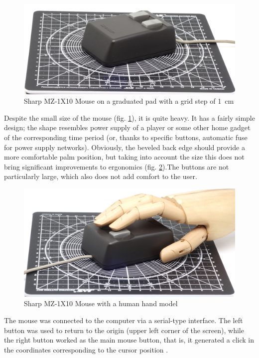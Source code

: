 \documentclass[11pt, a4paper]{article}
\begin{document}
\begin{figure}[h]
    \centering
    \includegraphics[scale=0.5]{1983_sharp_mz_1x10_mouse/size_30.jpg}
    \caption{Sharp MZ-1X10 Mouse on a graduated pad with a grid step of 1~cm}
    \label{fig:SharpMZ1x10Size}
\end{figure}

Despite the small size of the mouse (fig. \ref{fig:SharpMZ1x10Size}), it is quite heavy. It has a fairly simple design; the shape resembles power supply of a player or some other home gadget of the corresponding time period (or, thanks to specific buttons, automatic fuse for power supply networks). Obviously, the beveled back edge should provide a more comfortable palm position, but taking into account the size this does not bring significant improvements to ergonomics (fig. \ref{fig:SharpMZ1x10Hand}).The buttons are not particularly large, which also does not add comfort to the user.

\begin{figure}[h]
    \centering
    \includegraphics[scale=0.5]{1983_sharp_mz_1x10_mouse/hand_30.jpg}
    \caption{Sharp MZ-1X10 Mouse with a human hand model}
    \label{fig:SharpMZ1x10Hand}
\end{figure}

The mouse was connected to the computer via a serial-type interface. The left button was used to return to the origin (upper left corner of the screen), while the right button worked as the main mouse button, that is, it generated a click in the coordinates corresponding to the cursor position \cite{manual}.
\end{document}
